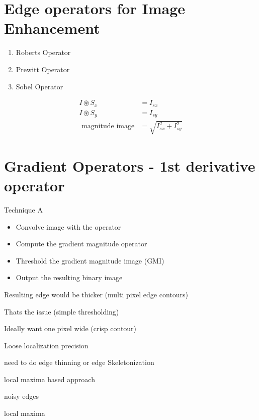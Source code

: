 \documentclass[11pt]{article}
\theoremstyle{definition}
\begin{document}
\section{Edge operators for Image Enhancement}
\begin{enumerate}
    \item Roberts Operator
    \item Prewitt Operator
    \item Sobel Operator
\end{enumerate}

\newpage
\pagestyle{fancy}  %


\begin{equation}
    \begin{aligned}
    I \circledast S_x &= I_{sx}\\
    I \circledast S_y &= I_{sy} \\
    \text{ magnitude image} &= \sqrt{I_{sx}^2 + I_{sy}^2}
\end{aligned}
\end{equation}


\section{Gradient Operators - 1st derivative operator}

Technique A


\begin{itemize}
  \item Convolve image with the operator
  \item Compute the gradient magnitude operator
  \item Threshold the gradient magnitude image (GMI)
  \item Output the resulting binary image
\end{itemize}

Resulting edge would be thicker (multi pixel edge contours)

Thats the issue (simple thresholding)

Ideally want one pixel wide (crisp contour)

Loose localization precision

need to do edge thinning or edge Skeletonization

local maxima based approach

noisy edges 

local maxima
\end{document}
